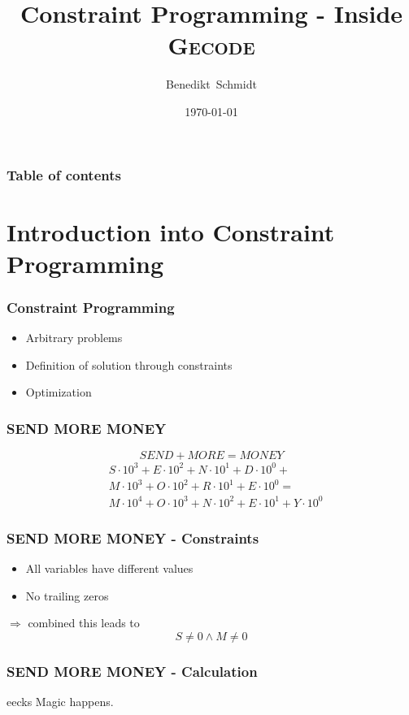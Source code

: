 \documentclass[hyperref={pdfpagelabels=false}]{beamer}
\title{Constraint Programming - Inside \textsc{Gecode}}
\author[Schmidt]{Benedikt~Schmidt}
\institute{Technische~Universit\"at~M\"unchen,~Germany}
\date{\today}
\begin{document}
\begin{frame}
\titlepage
\end{frame} 

\begin{frame}
\frametitle{Table of contents}
\tableofcontents
\end{frame} 

\section{Introduction into Constraint Programming}
\begin{frame}
	\frametitle{Constraint Programming}
	
	\begin{itemize}
		\item Arbitrary problems
		\item Definition of solution through constraints
		\item Optimization
	\end{itemize}
\end{frame}

\begin{frame}
	\frametitle{SEND MORE MONEY}
	
	\[SEND + MORE = MONEY\]
	\begin{equation}
	\begin{split}
		& S \cdot 10^3 + E \cdot 10^2 + N \cdot 10^1 + D \cdot 10^0 + \\ 
		& M \cdot 10^3 + O \cdot 10^2 + R \cdot 10^1 + E \cdot 10^0 = \\ 
		& M \cdot 10^4 + O \cdot 10^3 + N \cdot 10^2 + E \cdot 10^1 + Y \cdot 10^0
	\end{split}
	\end{equation}	
\end{frame}

\begin{frame}
	\frametitle{SEND MORE MONEY - Constraints}
	
	\begin{itemize}
		\item All variables have different values
		\item No trailing zeros
	\end{itemize}
	
	$\Rightarrow$ combined this leads to
	\begin{equation}
		S \ne 0 \land M \ne 0
	\end{equation}
\end{frame}

\begin{frame}
	\frametitle{SEND MORE MONEY - Calculation}
	
	\begin{beamercolorbox}[shadow=true, rounded=true]{eecks}
		\centering		
		\Large{Magic happens.}
	\end{beamercolorbox}
\end{frame}
\end{document}
